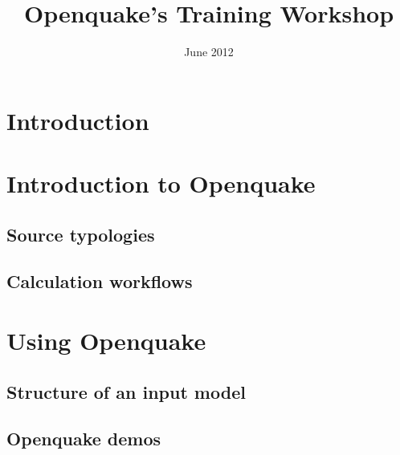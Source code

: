 \documentclass[11pt,a4paper,headings=small,dvips]{scrbook}
\begin{document}
\setcounter{page}{1}

\begin{titlepage}
	\title{ \textcolor{blue01}{\textsf{\bfseries\Huge 
        Openquake's Training Workshop}}}
	\date{June 2012}
	\publishers{GEM Foundation, Pavia}
\end{titlepage}

\pagestyle{scrheadings}
\maketitle
\renewcommand*\thesection{\arabic{section}}
\renewcommand*\thefigure{\thesection.\arabic{figure}}
\clearpage
\chapter*{Introduction}
\cleardoublepage
\tableofcontents
\cleardoublepage
\chapter{Introduction to Openquake}
\section{Source typologies}
\section{Calculation workflows}
\cleardoublepage
\chapter{Using Openquake}
\section{Structure of an input model}
\section{Openquake demos}
\cleardoublepage
\end{document}
